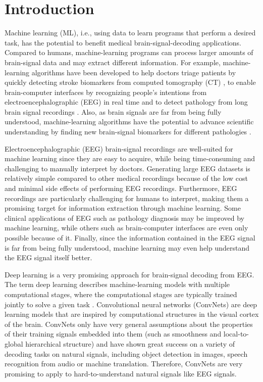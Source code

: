 \chapter{Introduction}\label{introduction}


Machine learning (ML), i.e., using data to learn programs that perform a
desired task, has the potential to benefit medical brain-signal-decoding
applications. Compared to humans, machine-learning programs can process
larger amounts of brain-signal data and may extract different
information. For example, machine-learning algorithms have been
developed to help doctors triage patients by quickly detecting stroke
biomarkers from computed tomography (CT)
\citep{chavva2022deep}, to enable brain-computer interfaces
by recognizing people's intentions from electroencephalographic (EEG) in
real time \citep{abiri2019comprehensive} and to detect
pathology from long brain signal recordings
\citep{gemein2020machine,schirrmeisterdeeppathology}. Also,
as brain signals are far from being fully understood, machine-learning
algorithms have the potential to advance scientific understanding by
finding new brain-signal biomarkers for different pathologies
\citep{raghu2020survey}.



    Electroencephalographic (EEG) brain-signal recordings are well-suited
for machine learning since they are easy to acquire, while being
time-consuming and challenging to manually interpret by doctors.
Generating large EEG datasets is relatively simple compared to other
medical recordings because of the low cost and minimal side effects of
performing EEG recordings. Furthermore, EEG recordings are particularly
challenging for humans to interpret, making them a promising target for
information extraction through machine learning. Some clinical
applications of EEG such as pathology diagnosis may be improved by
machine learning, while others such as brain-computer interfaces are
even only possible because of it. Finally, since the information
contained in the EEG signal is far from being fully understood, machine
learning may even help understand the EEG signal itself better.

Deep learning is a very promising approach for brain-signal decoding
from EEG. The term deep learning describes machine-learning models with
multiple computational stages, where the computational stages are
typically trained jointly to solve a given task
\citep{lecun_deep_2015,schmidhuber_deep_2015}.
Convolutional neural networks (ConvNets) are deep learning models that
are inspired by computational structures in the visual cortex of the
brain. ConvNets only have very
general assumptions about the properties of their training signals
embedded into them (such as smoothness and local-to-global hierarchical
structure) and have shown great success on a variety of  decoding tasks 
on natural signals, including object detection in images, speech recognition from audio or machine translation.
Therefore, ConvNets are very promising to apply to hard-to-understand
natural signals like EEG signals.

